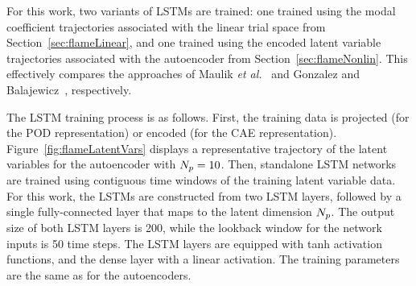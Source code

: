 For this work, two variants of LSTMs are trained: one trained using the modal coefficient trajectories associated with the linear trial space from Section~\ref{sec:flameLinear}, and one trained using the encoded latent variable trajectories associated with the autoencoder from Section~\ref{sec:flameNonlin}. This effectively compares the approaches of Maulik \textit{et al.}~\cite{Maulik2020} and Gonzalez and Balajewicz~\cite{Gonzalez2018}, respectively.

The LSTM training process is as follows. First, the training data is projected (for the POD representation) or encoded (for the CAE representation). Figure~\ref{fig:flameLatentVars} displays a representative trajectory of the latent variables for the autoencoder with $N_p = 10$. Then, standalone LSTM networks are trained using contiguous time windows of the training latent variable data. For this work, the LSTMs are constructed from two LSTM layers, followed by a single fully-connected layer that maps to the latent dimension $N_p$. The output size of both LSTM layers is 200, while the lookback window for the network inputs is 50 time steps. The LSTM layers are equipped with tanh activation functions, and the dense layer with a linear activation. The training parameters are the same as for the autoencoders. 

